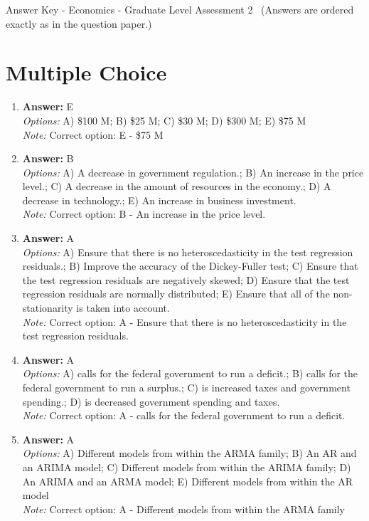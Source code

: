 \documentclass[12pt]{article}
\begin{document}
\begin{center}
Answer Key - Economics - Graduate Level Assessment 2 \
\small (Answers are ordered exactly as in the question paper.)
\end{center}

\section*{Multiple Choice}
\begin{enumerate}[label=\arabic*.]
\item \textbf{Answer:} E
\\ \textit{Options:} A) \$100 M; B) \$25 M; C) \$30 M; D) \$300 M; E) \$75 M
\\ \textit{Note:} Correct option: E - \$75 M
\item \textbf{Answer:} B
\\ \textit{Options:} A) A decrease in government regulation.; B) An increase in the price level.; C) A decrease in the amount of resources in the economy.; D) A decrease in technology.; E) An increase in business investment.
\\ \textit{Note:} Correct option: B - An increase in the price level.
\item \textbf{Answer:} A
\\ \textit{Options:} A) Ensure that there is no heteroscedasticity in the test regression residuals.; B) Improve the accuracy of the Dickey-Fuller test; C) Ensure that the test regression residuals are negatively skewed; D) Ensure that the test regression residuals are normally distributed; E) Ensure that all of the non-stationarity is taken into account.
\\ \textit{Note:} Correct option: A - Ensure that there is no heteroscedasticity in the test regression residuals.
\item \textbf{Answer:} A
\\ \textit{Options:} A) calls for the federal government to run a deficit.; B) calls for the federal government to run a surplus.; C) is increased taxes and government spending.; D) is decreased government spending and taxes.
\\ \textit{Note:} Correct option: A - calls for the federal government to run a deficit.
\item \textbf{Answer:} A
\\ \textit{Options:} A) Different models from within the ARMA family; B) An AR and an ARIMA model; C) Different models from within the ARIMA family; D) An ARIMA and an ARMA model; E) Different models from within the AR model
\\ \textit{Note:} Correct option: A - Different models from within the ARMA family
\end{enumerate}
\end{document}
